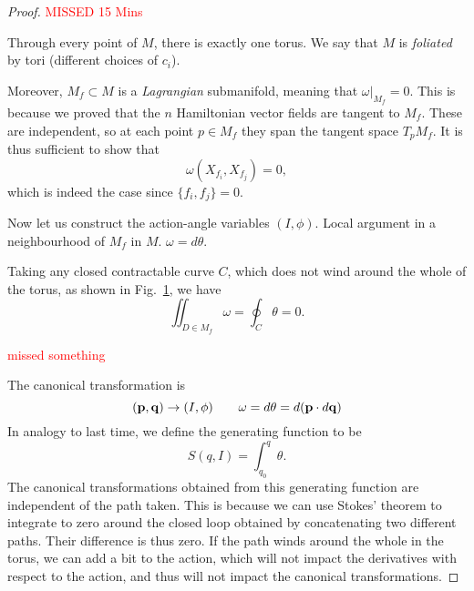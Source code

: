 
\begin{proof}
  \textcolor{red}{MISSED 15 Mins}
  
  Through every point of $M$, there is exactly one torus. We say that $M$ is \emph{foliated} by tori (different choices of $c_i$).
  
  Moreover, $M_f \subset M$ is a \emph{Lagrangian} submanifold, meaning that $\omega \rvert_{M_f} = 0$.
  This is because we proved that the $n$ Hamiltonian vector fields are tangent to $M_f$. These are independent, so at each point $p \in M_f$ they span the tangent space $T_p M_f$.
  It is thus sufficient to show that
  \begin{equation}
    \omega (X_{f_i}, X_{f_j}) = 0,
  \end{equation}
  which is indeed the case since $\{f_i, f_j\} = 0$.
  
  Now let us construct the action-angle variables $(I, \phi)$.
  Local argument in a neighbourhood of $M_f$ in $M$.
  $\omega = d \theta$.
  
  Taking any closed contractable curve $C$, which does not wind around the whole of the torus, as shown in Fig.~\ref{fig:l9f2}, we have
  \begin{equation}
    \iint_{D \in M_f} \omega = \oint_C \theta = 0.
  \end{equation}
  \begin{figure}[tbhp]
    \centering
    \def\svgwidth{0.4\columnwidth}
    
    \caption{}
    \label{fig:l9f2}
  \end{figure}
  
  \textcolor{red}{missed something}
  
  The canonical transformation is
  \begin{equation}
    (\vb{p}, \vb{q}) \to (I, \phi)\qquad
    \omega = d \theta = d (\vb{p} \cdot d\vb{q})
  \end{equation}
  In analogy to last time, we define the generating function to be
  \begin{equation}
    S (q, I) = \int_{q_0}^{q} \theta.
  \end{equation}
  The canonical transformations obtained from this generating function are independent of the path taken.
  This is because we can use Stokes' theorem to integrate to zero around the closed loop obtained by concatenating two different paths. Their difference is thus zero.
  If the path winds around the whole in the torus, we can add a bit to the action, which will not impact the derivatives with respect to the action, and thus will not impact the canonical transformations.
  

\end{proof}
